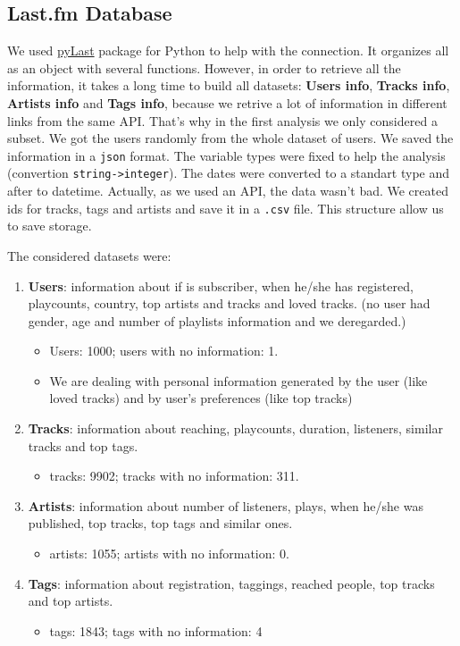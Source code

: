 \documentclass{article}
\begin{document}
\subsection{Last.fm Database}

We used \href{https://github.com/pylast/pylast}{pyLast}
package for Python to help with the connection. It organizes all as an object
with several functions. However, in order to retrieve all the information, it
takes a long time to build all datasets: \textbf{Users info}, \textbf{Tracks
info}, \textbf{Artists info} and \textbf{Tags info}, because we retrive a lot
of information in different links from the same API. That's why in the first
analysis we only considered a subset. We got the users randomly from the whole
dataset of users. We saved the information in a \lstinline{json} format. The
variable types were fixed to help the analysis (convertion
\lstinline{string->integer}). The dates were converted to a standart type and
after to datetime. Actually, as we used an API, the data wasn't bad. We
created ids for tracks, tags and artists and save it in a \lstinline{.csv}
file. This structure allow us to save storage. 

The considered datasets were: 

\begin{enumerate}
  \item \textbf{Users}: information about if is subscriber, when he/she 
  has registered, playcounts, country, top artists and tracks and loved
  tracks. (no user had gender, age and number of playlists information and
  we deregarded.)
  \begin{itemize}
    \item Users: 1000; users with no information: 1.
    \item We are dealing with personal information generated by the user (like loved
    tracks) and by user's preferences (like top tracks)    
  \end{itemize}
  \item \textbf{Tracks}: information about reaching, playcounts, duration,
  listeners, similar tracks and top tags.
  \begin{itemize}
    \item tracks: 9902; tracks with no information: 311.
  \end{itemize} 
  \item \textbf{Artists}: information about number of listeners, plays, when
  he/she was published, top tracks, top tags and similar ones.
  \begin{itemize}
    \item artists: 1055; artists with no information: 0.
  \end{itemize}
  \item \textbf{Tags}: information about registration, taggings, reached
  people, top tracks and top artists.
  \begin{itemize}
    \item tags: 1843; tags with no information: 4
  \end{itemize} 
\end{enumerate}
\end{document}
